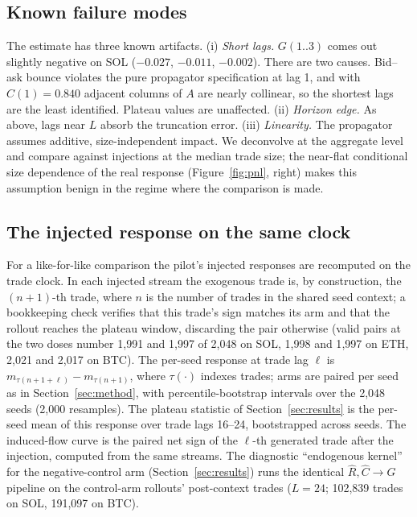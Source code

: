 \documentclass[11pt]{article}
\begin{document}
\subsection{Known failure modes}

The estimate has three known artifacts. (i) \emph{Short lags.} $G(1..3)$ comes out slightly negative on SOL ($-0.027$, $-0.011$, $-0.002$). There are two causes. Bid--ask bounce violates the pure propagator specification at lag 1, and with $C(1)=0.840$ adjacent columns of $A$ are nearly collinear, so the shortest lags are the least identified. Plateau values are unaffected. (ii) \emph{Horizon edge.} As above, lags near $L$ absorb the truncation error. (iii) \emph{Linearity.} The propagator assumes additive, size-independent impact. We deconvolve at the aggregate level and compare against injections at the median trade size; the near-flat conditional size dependence of the real response (Figure~\ref{fig:pnl}, right) makes this assumption benign in the regime where the comparison is made.

\subsection{The injected response on the same clock}

For a like-for-like comparison the pilot's injected responses are recomputed on the trade clock. In each injected stream the exogenous trade is, by construction, the $(n{+}1)$-th trade, where $n$ is the number of trades in the shared seed context; a bookkeeping check verifies that this trade's sign matches its arm and that the rollout reaches the plateau window, discarding the pair otherwise (valid pairs at the two doses number 1{,}991 and 1{,}997 of 2{,}048 on SOL, 1{,}998 and 1{,}997 on ETH, 2{,}021 and 2{,}017 on BTC). The per-seed response at trade lag $\ell$ is $m_{\tau(n+1+\ell)} - m_{\tau(n+1)}$, where $\tau(\cdot)$ indexes trades; arms are paired per seed as in Section~\ref{sec:method}, with percentile-bootstrap intervals over the 2{,}048 seeds (2{,}000 resamples). The plateau statistic of Section~\ref{sec:results} is the per-seed mean of this response over trade lags 16--24, bootstrapped across seeds. The induced-flow curve is the paired net sign of the $\ell$-th generated trade after the injection, computed from the same streams. The diagnostic ``endogenous kernel'' for the negative-control arm (Section~\ref{sec:results}) runs the identical $\hat{R},\hat{C} \to G$ pipeline on the control-arm rollouts' post-context trades ($L=24$; 102{,}839 trades on SOL, 191{,}097 on BTC).
\end{document}
